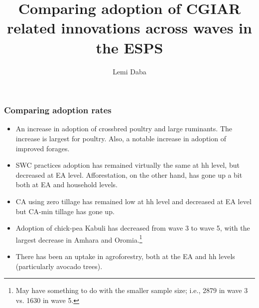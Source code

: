 \documentclass[11pt]{beamer}
\begin{document}
\author{Lemi Daba}
\title{Comparing adoption of CGIAR related innovations across waves in the ESPS}
\begin{frame}[plain]
	\maketitle
\end{frame}

\begin{frame}
\label{frstpg}
\frametitle{Comparing adoption rates}
\begin{itemize}
\item An increase in adoption of crossbred poultry and large ruminants. The increase is largest for poultry. Also, a notable increase in adoption of improved forages.\hyperlink{animaldynplt}{}

\item SWC practices adoption has remained virtually the same at hh level, but decreased at EA level. Afforestation, on the other hand, has gone up a bit both at EA and household levels. \hyperlink{swcaffdynplt}{}

\item CA using zero tillage has remained low at hh level and decreased at EA level but CA-min tillage has gone up. \hyperlink{cadynplt}{}

\item Adoption of chick-pea Kabuli has decreased from wave 3 to wave 5, with the largest decrease in Amhara and Oromia.\footnote{May have something to do with the smaller sample size; i.e., 2879 in wave 3 vs. 1630 in wave 5.}  \hyperlink{kabulidynplt}{}

\item There has been an uptake in agroforestry, both at the EA and hh levels (particularly avocado trees). \hyperlink{agroforestdynplt}{}

\end{itemize}

\end{frame}
\end{document}
